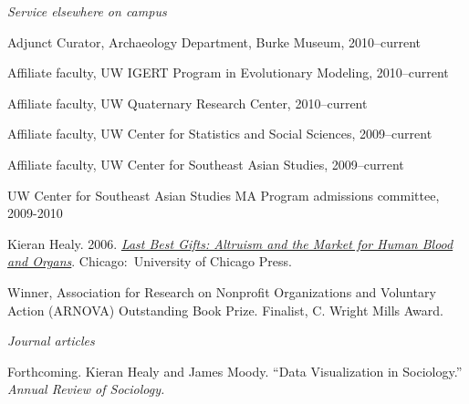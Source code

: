 \documentclass[11pt,article,oneside]{memoir}
\begin{document}
 \vspace{0.05in}

\noindent\emph{Service elsewhere on campus\vspace{0.01in}}


\ind Adjunct Curator, Archaeology Department, Burke Museum, 2010--current

\ind Affiliate faculty, UW IGERT Program in Evolutionary Modeling, 2010--current

\ind Affiliate faculty, UW Quaternary Research Center, 2010--current

\ind Affiliate faculty, UW Center for Statistics and Social Sciences, 2009--current

\ind Affiliate faculty, UW Center for Southeast Asian Studies, 2009--current

\ind UW Center for Southeast Asian Studies MA Program admissions committee, 2009-2010

\bigskip



\medskip




\ind  Kieran Healy. 2006. \emph{\href{http://www.lastbestgifts.com}{Last Best Gifts: Altruism and the Market for Human Blood and Organs}}. Chicago:~University of Chicago Press. \vspace{0.05in}

\ind \hspace{0.35in} \footnotesize Winner, Association for Research on Nonprofit Organizations and Voluntary Action (ARNOVA) Outstanding Book Prize. Finalist, C. Wright Mills Award. 

\vspace{-0.075in}

\normalsize

\bigskip
\noindent\emph{Journal articles \vspace{0.05in}}
 

\ind Forthcoming. Kieran Healy and James Moody. ``Data Visualization in Sociology.'' \emph{Annual Review of Sociology.}
\end{document}
